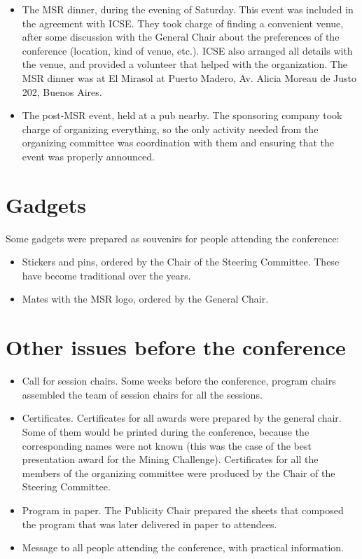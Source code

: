 \documentclass[a4paper]{report}
\begin{document}
\begin{itemize}
\item The MSR dinner, during the evening of Saturday. This event was included in the agreement with ICSE. They took charge of finding a convenient venue, after some discussion with the General Chair about the preferences of the conference (location, kind of venue, etc.). ICSE also arranged all details with the venue, and provided a volunteer that helped with the organization. The MSR dinner was at El Mirasol at Puerto Madero, Av. Alicia Moreau de Justo 202, Buenos Aires.

\item The post-MSR event, held at a pub nearby. The sponsoring company took charge of organizing everything, so the only activity needed from the organizing committee was coordination with them and ensuring that the event was properly announced.
\end{itemize}

\section{Gadgets}

Some gadgets were prepared as souvenirs for people attending the conference:

\begin{itemize}
\item Stickers and pins, ordered by the Chair of the Steering Committee. These have become traditional over the years.
\item Mates with the MSR logo, ordered by the General Chair.
\end{itemize}


\section{Other issues before the conference}

\begin{itemize}
\item Call for session chairs. Some weeks before the conference, program chairs assembled the team of session chairs for all the sessions.
\item Certificates. Certificates for all awards were prepared by the general chair. Some of them would be printed during the conference, because the corresponding names were not known (this was the case of the best presentation award for the Mining Challenge). Certificates for all the members of the organizing committee were produced by the Chair of the Steering Committee.
\item Program in paper. The Publicity Chair prepared the sheets that composed the program that was later delivered in paper to attendees.
\item Message to all people attending the conference, with practical information.
\end{itemize}
\end{document}
